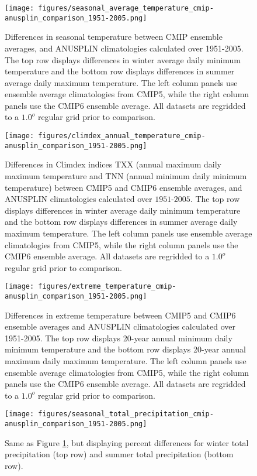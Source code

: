\documentclass[]{scrartcl}
\begin{document}
\begin{figure}[ht!]
	\centering
	\texttt{[image: figures/seasonal\_average\_temperature\_cmip-anusplin\_comparison\_1951-2005.png]}
	\caption[Tas]{Differences in seasonal temperature between CMIP ensemble averages, and ANUSPLIN climatologies calculated over 1951-2005. The top row displays differences in winter average daily minimum temperature and the bottom row displays differences in summer average daily maximum temperature. The left column panels use ensemble average climatologies from CMIP5, while the right column panels use the CMIP6 ensemble average. All datasets are regridded to a $1.0^o$ regular grid prior to comparison.}
	\label{fig:seas_tas_hist}
\end{figure}

\begin{figure}[!ht]
	\centering
	\texttt{[image: figures/climdex\_annual\_temperature\_cmip-anusplin\_comparison\_1951-2005.png]}
	\caption[Tas]{Differences in Climdex indices TXX (annual maximum daily maximum temperature and TNN (annual minimum daily minimum temperature) between CMIP5 and CMIP6 ensemble averages, and ANUSPLIN climatologies calculated over $1951$-$2005$. The top row displays differences in winter average daily minimum temperature and the bottom row displays differences in summer average daily maximum temperature. The left column panels use ensemble average climatologies from CMIP5, while the right column panels use the CMIP6 ensemble average. All datasets are regridded to a $1.0^o$ regular grid prior to comparison.}
	\label{fig:climdex_tas_hist}
\end{figure}

\begin{figure}[ht!]
	\centering
	\texttt{[image: figures/extreme\_temperature\_cmip-anusplin\_comparison\_1951-2005.png]}
	\caption[Tas]{Differences in extreme temperature between CMIP5 and CMIP6 ensemble averages and ANUSPLIN climatologies calculated over 1951-2005. The top row displays 20-year annual minimum daily minimum temperature and the bottom row displays 20-year annual maximum daily maximum temperature. The left column panels use ensemble average climatologies from CMIP5, while the right column panels use the CMIP6 ensemble average. All datasets are regridded to a $1.0^o$ regular grid prior to comparison.}
	\label{fig:ext_tas_hist}
\end{figure}

\begin{figure}[ht!]
	\centering
	\texttt{[image: figures/seasonal\_total\_precipitation\_cmip-anusplin\_comparison\_1951-2005.png]}
	\caption[Pr]{Same as Figure \ref{fig:seas_tas_hist}, but displaying percent differences for winter total precipitation (top row) and summer total precipitation (bottom row).}
	\label{fig:seas_pr_hist}
\end{figure}
\end{document}
